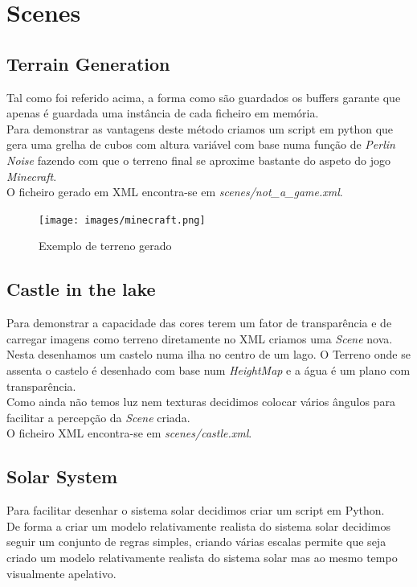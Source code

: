 \documentclass[a4paper]{report}
\begin{document}
\chapter{Scenes}
\section{Terrain Generation}
Tal como foi referido acima, a forma como são guardados os buffers garante que
apenas é guardada uma instância de cada ficheiro em memória. \\
Para demonstrar as vantagens deste método criamos um script em python que gera
uma grelha de cubos com altura variável com base numa função de \textit{Perlin
Noise} fazendo com que o terreno final se aproxime bastante do aspeto do jogo
\textit{Minecraft}.\\
O ficheiro gerado em XML encontra-se em \textit{scenes/not\_a\_game.xml}.

\begin{figure}[H]
    \centering 
    \texttt{[image: images/minecraft.png]}  
    \caption{Exemplo de terreno gerado}
\end{figure}

\section{Castle in the lake}
Para demonstrar a capacidade das cores terem um fator de transparência e de
carregar imagens como terreno diretamente no XML criamos uma \textit{Scene}
nova. Nesta desenhamos um castelo numa ilha no centro de um lago. O Terreno onde
se assenta o castelo é desenhado com base num \textit{HeightMap} e a água é um
plano com transparência.\\
Como ainda não temos luz nem texturas decidimos colocar vários ângulos para
facilitar a percepção da \textit{Scene} criada.\\
O ficheiro XML encontra-se em \textit{scenes/castle.xml}.

\section{Solar System}
Para facilitar desenhar o sistema solar decidimos criar um script em Python.\\
De forma a criar um modelo relativamente realista do sistema solar decidimos
seguir um conjunto de regras simples, criando várias escalas permite que seja
criado um modelo relativamente realista do sistema solar mas ao mesmo tempo
visualmente apelativo.\\
\end{document}
